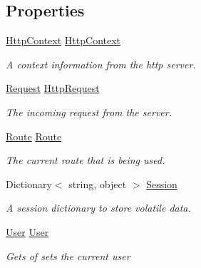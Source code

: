 \subsection*{Properties}
\begin{DoxyCompactItemize}
\item 
\hyperlink{class_mvc_1_1_http_context}{Http\+Context} \hyperlink{class_mvc_1_1_base_controller_ad7b4a9abd6951cae8d4220a4ccea783d}{Http\+Context}
\begin{DoxyCompactList}\small\item\em A context information from the http server. \end{DoxyCompactList}\item 
\hyperlink{class_mvc_1_1_request}{Request} \hyperlink{class_mvc_1_1_base_controller_a72a2384832ba902229f295157ad71282}{Http\+Request}
\begin{DoxyCompactList}\small\item\em The incoming request from the server. \end{DoxyCompactList}\item 
\hyperlink{class_mvc_1_1_route}{Route} \hyperlink{class_mvc_1_1_base_controller_a860c6d8a5ffdadec5f46d2baeaa20186}{Route}
\begin{DoxyCompactList}\small\item\em The current route that is being used. \end{DoxyCompactList}\item 
Dictionary$<$ string, object $>$ \hyperlink{class_mvc_1_1_base_controller_ac9ec764bde3833c4da076a64b0f3d0cc}{Session}
\begin{DoxyCompactList}\small\item\em A session dictionary to store volatile data. \end{DoxyCompactList}\item 
\hyperlink{class_mvc_1_1_user}{User} \hyperlink{class_mvc_1_1_base_controller_a441230929ad77f983c662d419474c41a}{User}
\begin{DoxyCompactList}\small\item\em Gets of sets the current user \end{DoxyCompactList}\end{DoxyCompactItemize}


